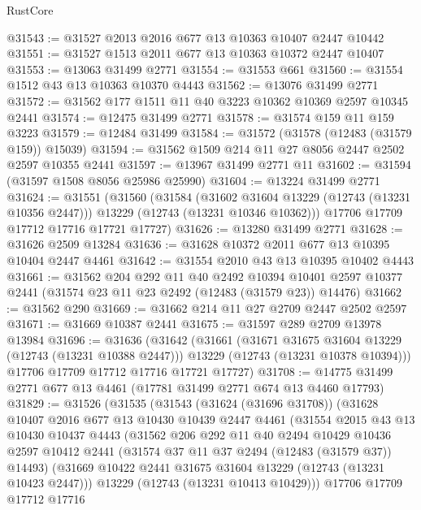 \begin{lexlean}{RustCore}
\begin{coremodule}
@31543 := @31527 @2013 @2016 @677 @13 @10363 @10407 @2447 @10442
@31551 := @31527 @1513 @2011 @677 @13 @10363 @10372 @2447 @10407
@31553 := @13063 @31499 @2771
@31554 := @31553 @661
@31560 := @31554 @1512 @43 @13 @10363 @10370 @4443
@31562 := @13076 @31499 @2771
@31572 := @31562 @177 @1511 @11 @40 @3223 @10362 @10369 @2597 @10345 @2441
@31574 := @12475 @31499 @2771
@31578 := @31574 @159 @11 @159 @3223
@31579 := @12484 @31499
@31584 := @31572 (@31578 (@12483 (@31579 @159)) @15039)
@31594 := @31562 @1509 @214 @11 @27 @8056 @2447 @2502 @2597 @10355 @2441
@31597 := @13967 @31499 @2771 @11
@31602 := @31594 (@31597 @1508 @8056 @25986 @25990)
@31604 := @13224 @31499 @2771
@31624 := @31551
    (@31560
      (@31584
        (@31602 @31604 @13229 (@12743 (@13231 @10356 @2447)))
        @13229
        (@12743 (@13231 @10346 @10362)))
      @17706
      @17709
      @17712
      @17716
      @17721
      @17727)
@31626 := @13280 @31499 @2771
@31628 := @31626 @2509 @13284
@31636 := @31628 @10372 @2011 @677 @13 @10395 @10404 @2447 @4461
@31642 := @31554 @2010 @43 @13 @10395 @10402 @4443
@31661 := @31562
    @204
    @292
    @11
    @40
    @2492
    @10394
    @10401
    @2597
    @10377
    @2441
    (@31574 @23 @11 @23 @2492 (@12483 (@31579 @23)) @14476)
@31662 := @31562 @290
@31669 := @31662 @214 @11 @27 @2709 @2447 @2502 @2597
@31671 := @31669 @10387 @2441
@31675 := @31597 @289 @2709 @13978 @13984
@31696 := @31636
    (@31642
      (@31661
        (@31671 @31675 @31604 @13229 (@12743 (@13231 @10388 @2447)))
        @13229
        (@12743 (@13231 @10378 @10394)))
      @17706
      @17709
      @17712
      @17716
      @17721
      @17727)
@31708 := @14775 @31499 @2771 @677 @13 @4461 (@17781 @31499 @2771 @674 @13 @4460 @17793)
@31829 := @31526
    (@31535
      (@31543
        (@31624 (@31696 @31708))
        (@31628
          @10407
          @2016
          @677
          @13
          @10430
          @10439
          @2447
          @4461
          (@31554
            @2015
            @43
            @13
            @10430
            @10437
            @4443
            (@31562
              @206
              @292
              @11
              @40
              @2494
              @10429
              @10436
              @2597
              @10412
              @2441
              (@31574 @37 @11 @37 @2494 (@12483 (@31579 @37)) @14493)
              (@31669 @10422 @2441 @31675 @31604 @13229 (@12743 (@13231 @10423 @2447)))
              @13229
              (@12743 (@13231 @10413 @10429)))
            @17706
            @17709
            @17712
            @17716

\end{coremodule}
\end{lexlean}
